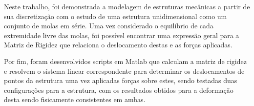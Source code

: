 \documentclass[12pt,a4paper]{article}
\begin{document}
\par Neste trabalho, foi demonstrada a modelagem de estruturas mecânicas a partir de sua discretização com o estudo de uma estrutura unidimensional como um conjunto de molas em série. Uma vez considerado o equilíbrio de cada extremidade livre das molas, foi possível encontrar uma expressão geral para a Matriz de Rigidez que relaciona o deslocamento destas e as forças aplicadas.
\par Por fim, foram desenvolvidos scripts em Matlab que calculam a matriz de rigidez e resolvem o sistema linear correspondente para determinar os deslocamentos de pontos da estrutura uma vez aplicadas forças sobre estes, sendo testadas duas configurações para a estrutura, com os resultados obtidos para a deformação desta sendo fisicamente consistentes em ambas.
\end{document}
